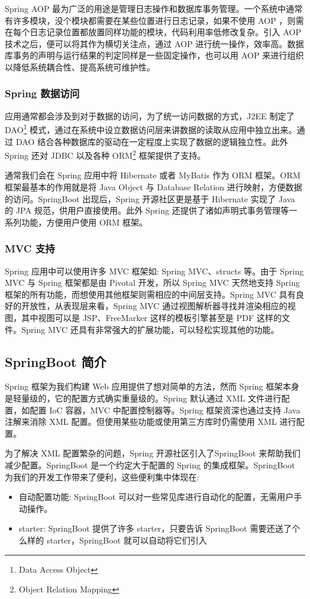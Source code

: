 \documentclass[a4paper, 12pt, UTF8]{ctexart}
\begin{document}
	Spring AOP 最为广泛的用途是管理日志操作和数据库事务管理。一个系统中通常有许多模块，没个模块都需要在某些位置进行日志记录，如果不使用 AOP ，则需在每个日志记录位置都放置同样功能的模块，代码利用率低修改复杂。引入 AOP 技术之后，便可以将其作为横切关注点，通过 AOP 进行统一操作，效率高。数据库事务的声明与运行结果的判定同样是一些固定操作，也可以用 AOP 来进行组织以降低系统耦合性、提高系统可维护性。
	
	\subsubsection{Spring 数据访问}
	应用通常都会涉及到对于数据的访问，为了统一访问数据的方式，J2EE 制定了 DAO\footnote{Data Access Object} 模式，通过在系统中设立数据访问层来讲数据的读取从应用中独立出来。通过 DAO 结合各种数据库的驱动在一定程度上实现了数据的逻辑独立性\cite{Walls2016a}。此外 Spring 还对 JDBC 以及各种 ORM\footnote{Object Relation Mapping} 框架提供了支持。
	
	通常我们会在 Spring 应用中将 Hibernate 或者 MyBatis 作为 ORM 框架。ORM 框架最基本的作用就是将 Java Object 与 Database Relation 进行映射，方便数据的访问。SpringBoot 出现后，Spring 开源社区更是基于 Hibernate 实现了 Java 的 JPA 规范，供用户直接使用。此外 Spring 还提供了诸如声明式事务管理等一系列功能，方便用户使用 ORM 框架。
	
	\subsubsection{MVC 支持}
	Spring 应用中可以使用许多 MVC 框架如: Spring MVC、structs 等。由于 Spring MVC 与 Spring 框架都是由 Pivotal 开发，所以 Spring MVC 天然地支持 Spring 框架的所有功能，而想使用其他框架则需相应的中间层支持。Spring MVC 具有良好的开放性，从表现层来看，Spring MVC 通过视图解析器寻找并渲染相应的视图，其中视图可以是 JSP、FreeMarker 这样的模板引擎甚至是 PDF 这样的文件。Spring MVC 还具有非常强大的扩展功能，可以轻松实现其他的功能\cite{Warin2017}。
	
	\subsection{SpringBoot 简介}
	Spring 框架为我们构建 Web 应用提供了想对简单的方法，然而 Spring 框架本身是轻量级的，它的配置方式确实重量级的。Spring 默认通过 XML 文件进行配置，如配置 IoC 容器，MVC 中配置控制器等。Spring 框架资深也通过支持 Java 注解来消除 XML 配置。但使用某些功能或使用第三方库时仍需使用 XML 进行配置。
	
	为了解决 XML 配置繁杂的问题，Spring 开源社区引入了SpringBoot 来帮助我们减少配置。SpringBoot 是一个约定大于配置的 Spring 的集成框架。SpringBoot 为我们的开发工作带来了便利，这些便利集中体现在:
	\begin{itemize}
  \item 自动配置功能: SpringBoot 可以对一些常见库进行自动化的配置，无需用户手动操作。
  \item starter: SpringBoot 提供了许多 starter，只要告诉 SpringBoot 需要还送了个么样的 starter，SpringBoot 就可以自动将它们引入
\end{itemize}
\end{document}
